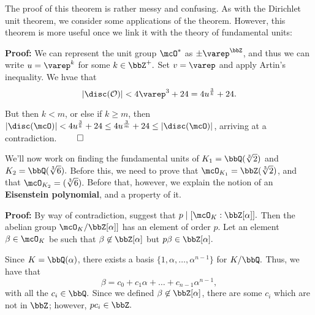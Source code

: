 \documentclass[a4paper, 12pt,oneside,openany]{book}
\begin{document}
The proof of this theorem is rather messy and confusing. As with the Dirichlet unit theorem, we consider some applications of the theorem. However, this theorem is more useful once we link it with the theory of fundamental units:


\textbf{Proof:} We can represent the unit group $\mcO^*$ as $\pm \varep^{\bbZ}$, and thus we can write $u=\varep^k$ for some $k\in\bbZ^+.$ Set $v=\varep$ and apply Artin's inequality. We hvae that $$|\disc({\mathcal{O}})| < 4\varep^3+24 = 4u^{\frac{3}{k}}+24.$$ 

But then $k<m$, or else if $k \geq m$, then $|\disc({\mcO})|<4u^{\frac{3}{k}}+24\leq4u^{\frac{3}{m}}+24 \leq |\disc({\mcO})|$, arriving at a contradiction. $\qed$

We'll now work on finding the fundamental units of $K_1=\bbQ(\sqrt[3]{2})$ and $K_2=\bbQ(\sqrt[3]{6}).$ Before this, we need to prove that $\mcO_{K_1}=\bbZ(\sqrt[3]{2})$, and that $\mcO_{K_2}=(\sqrt[3]{6}).$ Before that, however, we explain the notion of an \textbf{Eisenstein polynomial}, and a property of it.



\textbf{Proof:} By way of contradiction, suggest that $p\mid [\mcO_K:\bbZ[\alpha]].$ Then the abelian group $\mcO_K / \bbZ[\alpha]]$ has an element of order $p.$ Let an element $\beta \in \mcO_K$ be such that $\beta \not\in \bbZ[\alpha]$ but $p\beta \in \bbZ[\alpha].$ 

Since $K=\bbQ(\alpha)$, there exists a basis $\{1, \alpha, \dots, \alpha^{n-1}\}$ for $K/\bbQ.$ Thus, we have that $$\beta = c_0+c_1\alpha+\dots+c_{n-1}\alpha^{n-1},$$ with all the $c_i \in \bbQ.$ Since we defined $\beta \not\in \bbZ[\alpha]$, there are some $c_i$ which are not in $\bbZ$; however, $pc_i \in \bbZ.$ 
\end{document}

